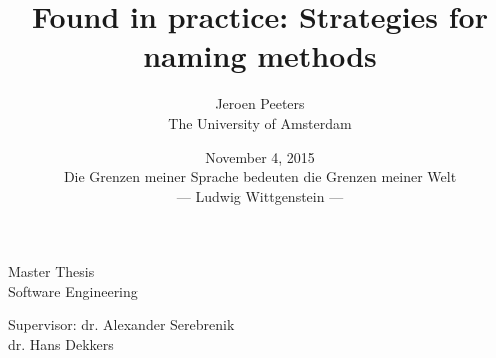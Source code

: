 \documentclass{article}%
\begin{document}
\title{Found in practice: Strategies for naming methods}
\author{Jeroen Peeters
\\The University of Amsterdam}
\date{November 4, 2015 \\\vspace*{12.5cm}\small{Die Grenzen meiner Sprache bedeuten die Grenzen meiner Welt\\--- Ludwig Wittgenstein ---}} %
\maketitle
\thispagestyle{empty}
\newpage

\begin{center}
Master Thesis \\
Software Engineering \\
\vspace{1cm}

\vspace{1cm}
Supervisor: dr. Alexander Serebrenik\\
\hspace{7 mm}dr. Hans Dekkers\\
\end{center}
\thispagestyle{empty}
\newpage


\renewcommand{\contentsname}{ \begin{center} --- Table of Contents --- \end{center}}
\setcounter{tocdepth}{1}
\tableofcontents
{}
\newpage






\newpage
{}


\appendix




\end{document}
